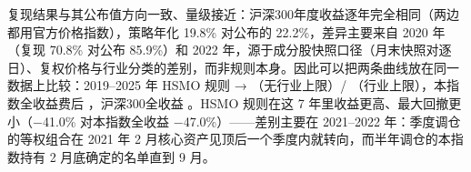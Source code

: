 \documentclass[11pt,a4paper]{article}
\begin{document}
\begin{table}[!htbp]
\centering
\footnotesize
\caption{逐年收益：HSMO 公布值、复现值与本指数}\label{tab:hsmo_ann}
\end{table}

复现结果与其公布值方向一致、量级接近：沪深300年度收益逐年完全相同（两边都用官方价格指数），策略年化 19.8\% 对公布的 22.2\%，差异主要来自 2020 年（复现 70.8\% 对公布 85.9\%）和 2022 年，源于成分股快照口径（月末快照对逐日）、复权价格与行业分类的差别，而非规则本身。因此可以把两条曲线放在同一数据上比较：2019--2025 年 HSMO 规则  → （无行业上限）/ （行业上限），本指数全收益费后 ，沪深300全收益 。HSMO 规则在这 7 年里收益更高、最大回撤更小（$-$41.0\% 对本指数全收益 $-$47.0\%）——差别主要在 2021--2022 年：季度调仓的等权组合在 2021 年 2 月核心资产见顶后一个季度内就转向，而半年调仓的本指数持有 2 月底确定的名单直到 9 月。
\FloatBarrier
\end{document}
